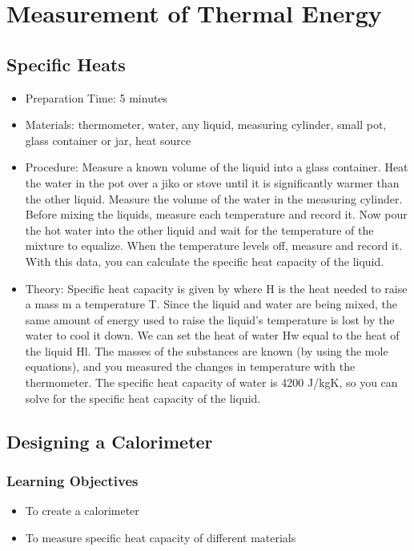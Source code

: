 \section{Measurement of Thermal Energy}



\subsection{Specific Heats}
\begin{itemize}
\item{Preparation Time: 5 minutes}
\item{Materials: thermometer, water, any liquid, measuring cylinder, small pot, glass container or jar, heat source}
\item{Procedure: Measure a known volume of the liquid into a glass container. Heat the water in the pot over a jiko or stove until it is significantly warmer than the other liquid. Measure the volume of the water in the measuring cylinder. Before mixing the liquids, measure each temperature and record it. Now pour the hot water into the other liquid and wait for the temperature of the mixture to equalize. When the temperature levels off, measure and record it. With this data, you can calculate the specific heat capacity of the liquid.}
\item{Theory: Specific heat capacity is given by where H is the heat needed to raise a mass m a temperature T. Since the liquid and water are being mixed, the same amount of energy used to raise the liquid’s temperature is lost by the water to cool it down. We can set the heat of water Hw equal to the heat of the liquid Hl. The masses of the substances are known (by using the mole equations), and you measured the changes in temperature with the thermometer. The specific heat capacity of water is 4200 J/kgK, so you can solve for the specific heat capacity of the liquid.}
\end{itemize}


\subsection{Designing a Calorimeter}

\subsubsection*{Learning Objectives}
\begin{itemize}
\item{To create a calorimeter}
\item{To measure specific heat capacity of different materials}
\end{itemize}

